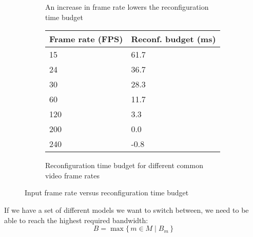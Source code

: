 \begin{figure}[htbp]
    \centering
    \begin{subfigure}[b]{0.48\textwidth}
        \begin{adjustbox}{width=\linewidth}
        
        \end{adjustbox}
        \caption{An increase in frame rate lowers the reconfiguration time budget}
        \label{}
    \end{subfigure}
    \hfill
    \begin{subfigure}[b]{0.48\textwidth}
        \begin{tabular}{@{}ll@{}}
        \toprule
        Frame rate (FPS) & Reconf. budget (ms) \\ \midrule
        15               & 61.7                \\
        24               & 36.7                \\
        30               & 28.3                \\
        60               & 11.7                \\
        120              & 3.3                 \\
        200              & 0.0                 \\
        240              & -0.8                \\ \bottomrule
        \end{tabular}
        \caption{Reconfiguration time budget for different common video frame rates}
        \label{tab:common_fps}
    \end{subfigure}
    \caption[]{Input frame rate versus reconfiguration time budget}
    \label{fig:frame_rate_versus_time_budget}
\end{figure}

If we have a set of different models we want to switch between, we need to be able to reach the highest required bandwidth:
\begin{equation*}
    B = \max\{\,m \in M \mid B_m \,\} 
\end{equation*}
